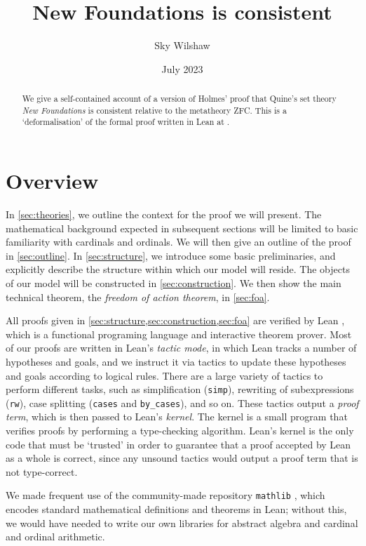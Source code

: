 \documentclass{article}
\title{New Foundations is consistent}
\author{Sky Wilshaw}
\date{July 2023}
\theoremstyle{definition}
\theoremstyle{remark}
\begin{document}
\maketitle

\begin{abstract}
	We give a self-contained account of a version of Holmes' proof \cite{holmes2023nf} that Quine's set theory \emph{New Foundations} \cite{quine-nf} is consistent relative to the metatheory ZFC.
	This is a `deformalisation' of the formal proof written in Lean at \cite{leanprover-community-con-nf}.
\end{abstract}

\tableofcontents

\section{Overview}

In \cref{sec:theories}, we outline the context for the proof we will present.
The mathematical background expected in subsequent sections will be limited to basic familiarity with cardinals and ordinals.
We will then give an outline of the proof in \cref{sec:outline}.
In \cref{sec:structure}, we introduce some basic preliminaries, and explicitly describe the structure within which our model will reside.
The objects of our model will be constructed in \cref{sec:construction}.
We then show the main technical theorem, the \emph{freedom of action theorem}, in \cref{sec:foa}.

All proofs given in \cref{sec:structure,sec:construction,sec:foa} are verified by Lean \cite{lean}, which is a functional programing language and interactive theorem prover.
Most of our proofs are written in Lean's \emph{tactic mode}, in which Lean tracks a number of hypotheses and goals, and we instruct it via tactics to update these hypotheses and goals according to logical rules.
There are a large variety of tactics to perform different tasks, such as simplification (\texttt{simp}), rewriting of subexpressions (\texttt{rw}), case splitting (\texttt{cases} and \texttt{by\_cases}), and so on.
These tactics output a \emph{proof term}, which is then passed to Lean's \emph{kernel}.
The kernel is a small program that verifies proofs by performing a type-checking algorithm.
Lean's kernel is the only code that must be `trusted' in order to guarantee that a proof accepted by Lean as a whole is correct, since any unsound tactics would output a proof term that is not type-correct.

We made frequent use of the community-made repository \texttt{mathlib} \cite{mathlib2020}, which encodes standard mathematical definitions and theorems in Lean; without this, we would have needed to write our own libraries for abstract algebra and cardinal and ordinal arithmetic.
\end{document}
